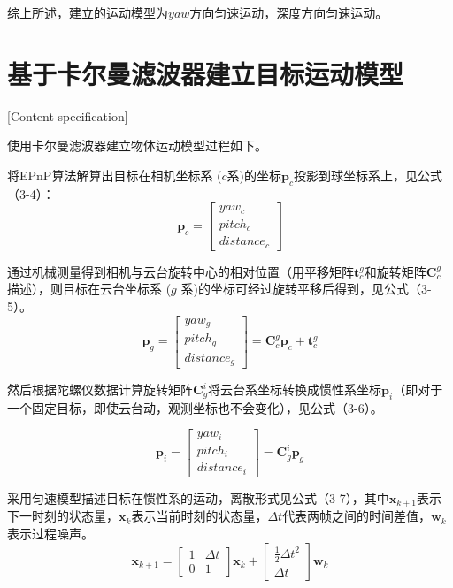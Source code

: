 综上所述，建立的运动模型为$yaw$方向匀速运动，深度方向匀速运动。

\section{基于卡尔曼滤波器建立目标运动模型}[Content specification]

使用卡尔曼滤波器建立物体运动模型过程如下。
\par
将EPnP算法解算出目标在相机坐标系 ($c$系)的坐标$\boldsymbol p_c$投影到球坐标系上，见公式（3-4）：
\begin{equation} \boldsymbol p_c=\left[\begin{array}{c} yaw_c\\ pitch_c \\ distance_c \end{array}\right] \end{equation}
\par 
通过机械测量得到相机与云台旋转中心的相对位置（用平移矩阵$\boldsymbol t_{c}^{g}$和旋转矩阵$\boldsymbol C_{c}^{g}$描述），则目标在云台坐标系 ($g$ 系)的坐标可经过旋转平移后得到，见公式（3-5）。
\begin{equation} \boldsymbol p_g=\left[\begin{array}{c} yaw_g\\ pitch_g\\ distance_g \end{array}\right] =\boldsymbol C_{c}^{g}\boldsymbol p_c + \boldsymbol t_{c}^{g} \end{equation}
\par 
然后根据陀螺仪数据计算旋转矩阵$\boldsymbol C_{g}^{i}$将云台系坐标转换成惯性系坐标$\boldsymbol p_i$（即对于一个固定目标，即使云台动，观测坐标也不会变化），见公式（3-6）。


\begin{equation} \boldsymbol p_i=\left[\begin{array}{c} yaw_i\\ pitch_i\\ distance_i \end{array}\right] =\boldsymbol C_{g}^{i}\boldsymbol p_g \end{equation}

\par
采用匀速模型描述目标在惯性系的运动，离散形式见公式（3-7），其中$\boldsymbol x_{k+1}$表示下一时刻的状态量，$\boldsymbol x_k$表示当前时刻的状态量，$\Delta t$代表两帧之间的时间差值，$\boldsymbol w_k$表示过程噪声。
\begin{equation} \boldsymbol x_{k+1} =\left[\begin{array}{cc} {1} & \Delta t  \\ 0 & {1}  \end{array}\right]\boldsymbol x_{k} + \left[\begin{array}{c} {\frac{1}{2}\Delta t^2} \\ {\Delta t}  \end{array}\right] \boldsymbol w_k \end{equation}



